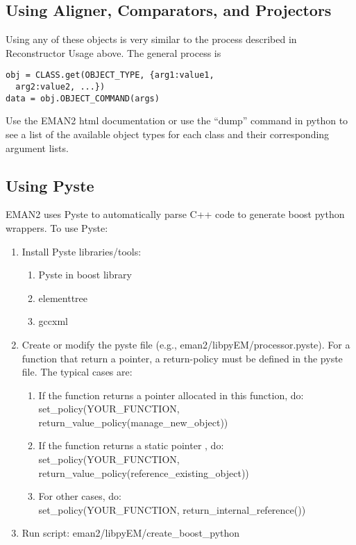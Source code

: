     \subsection{Using Aligner, Comparators, and Projectors}
      
    Using any of these objects is very similar to the process described in
    Reconstructor Usage above. The general process is
    \begin{verbatim}
obj = CLASS.get(OBJECT_TYPE, {arg1:value1,
  arg2:value2, ...})
data = obj.OBJECT_COMMAND(args)
\end{verbatim}
    Use the EMAN2 html documentation or use the ``dump'' command in
    python to see a list of the available object types for each class
    and their corresponding argument lists.

    \subsection{Using Pyste} 
    EMAN2 uses Pyste to automatically parse C++ code to generate boost
    python wrappers. To use Pyste:

    \begin{enumerate}
    \item
      Install Pyste libraries/tools: 
      \begin{enumerate}
      \item
	Pyste in boost library
      \item
	elementtree 
      \item
	gccxml
      \end{enumerate}
    \item
      Create or modify the pyste file (e.g.,
      eman2/libpyEM/processor.pyste). For a function that return a
      pointer, a return-policy must be defined in the pyste
      file. The typical cases are: 
      \begin{enumerate}
      \item If the function returns a pointer allocated in this
	function, do: \\	    
	{ set\_policy(YOUR\_FUNCTION, return\_value\_policy(manage\_new\_object))}
      \item If the function returns a static pointer , do: \\
	{ set\_policy(YOUR\_FUNCTION, return\_value\_policy(reference\_existing\_object))}
      \item For other cases, do: \\
	{set\_policy(YOUR\_FUNCTION, return\_internal\_reference())}
      \end{enumerate}
    \item
      Run script: eman2/libpyEM/create\_boost\_python
    \end{enumerate}
    
